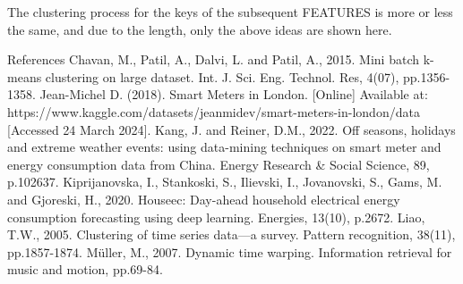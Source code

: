 \documentclass[11pt]{article}
\begin{document}
    The clustering process for the keys of the subsequent FEATURES is more
or less the same, and due to the length, only the above ideas are shown
here.

    References Chavan, M., Patil, A., Dalvi, L. and Patil, A., 2015. Mini
batch k-means clustering on large dataset. Int. J. Sci. Eng. Technol.
Res, 4(07), pp.1356-1358. Jean-Michel D. (2018). Smart Meters in London.
{[}Online{]} Available at:
https://www.kaggle.com/datasets/jeanmidev/smart-meters-in-london/data
{[}Accessed 24 March 2024{]}. Kang, J. and Reiner, D.M., 2022. Off
seasons, holidays and extreme weather events: using data-mining
techniques on smart meter and energy consumption data from China. Energy
Research \& Social Science, 89, p.102637. Kiprijanovska, I., Stankoski,
S., Ilievski, I., Jovanovski, S., Gams, M. and Gjoreski, H., 2020.
Houseec: Day-ahead household electrical energy consumption forecasting
using deep learning. Energies, 13(10), p.2672. Liao, T.W., 2005.
Clustering of time series data---a survey. Pattern recognition, 38(11),
pp.1857-1874. Müller, M., 2007. Dynamic time warping. Information
retrieval for music and motion, pp.69-84.


    
    
    
\end{document}
